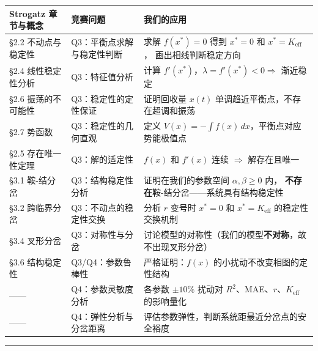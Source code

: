 \documentclass[12pt,a4paper]{article}
\begin{document}
\begin{center}
\begin{tabular}{p{5cm}p{5cm}p{4.5cm}}
\toprule
\textbf{Strogatz 章节与概念} & \textbf{竞赛问题} & \textbf{我们的应用} \\
\midrule
\S2.2 不动点与稳定性 &
Q3：平衡点求解与稳定性判断 &
求解 $f(x^*)=0$ 得到 $x^*=0$ 和 $x^*=K_{\text{eff}}$，
画出相线判断稳定方向 \\

\S2.4 线性稳定性分析 &
Q3：特征值分析 &
计算 $f'(x^*)$，$\lambda = f'(x^*) < 0 \Rightarrow$ 渐近稳定 \\

\S2.6 振荡的不可能性 &
Q3：稳定性的定性保证 &
证明回收量 $x(t)$ 单调趋近平衡点，不存在超调和振荡 \\

\S2.7 势函数 &
Q3：稳定性的几何直观 &
定义 $V(x) = -\int f(x)\,dx$，平衡点对应势能极值点 \\

\S2.5 存在唯一性定理 &
Q3：解的适定性 &
$f(x)$ 和 $f'(x)$ 连续 $\Rightarrow$ 解存在且唯一 \\

\S3.1 鞍-结分岔 &
Q3：结构稳定性分析 &
证明在我们的参数空间 $\alpha,\beta \geq 0$ 内，
\textbf{不存在}鞍-结分岔——系统具有结构稳定性 \\

\S3.2 跨临界分岔 &
Q3：不动点的稳定性交换 &
分析 $r$ 变号时 $x^*=0$ 和 $x^*=K_{\text{eff}}$ 的稳定性交换机制 \\

\S3.4 叉形分岔 &
Q3：对称性与分岔 &
讨论模型的对称性（我们的模型\textbf{不对称}，故不出现叉形分岔） \\

\S3.6 结构稳定性 &
Q3/Q4：参数鲁棒性 &
严格证明：$f(x)$ 的小扰动不改变相图的定性结构 \\

—— &
Q4：参数灵敏度分析 &
各参数 $\pm 10\%$ 扰动对 $R^2$、MAE、$r$、$K_{\text{eff}}$ 的影响量化 \\

—— &
Q4：弹性分析与分岔距离 &
评估参数弹性，判断系统距最近分岔点的安全裕度 \\

\bottomrule
\end{tabular}
\end{center}

\vspace{12pt}
\hrule
\vspace{12pt}
\end{document}
